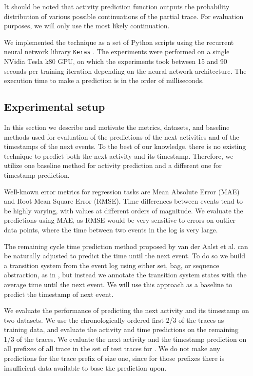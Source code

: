 \documentclass[runningheads,a4paper]{llncs}
\begin{document}
It should be noted that activity prediction function  outputs the probability distribution of various possible continuations of the partial trace. For evaluation purposes, we will only use the most likely continuation.

We implemented the technique as a set of Python scripts using the recurrent neural network library \texttt{Keras} \cite{Chollet2015}. The experiments were performed on a single NVidia Tesla k80 GPU, on which the experiments took between 15 and 90 seconds per training iteration depending on the neural network architecture. The execution time to make a prediction is in the order of milliseconds. 

\subsection{Experimental setup}
In this section we describe and motivate the metrics, datasets, and baseline methods used for evaluation of the predictions of the next activities and of the timestamps of the next events. To the best of our knowledge, there is no existing technique to predict both the next activity and its timestamp. Therefore, we utilize one baseline method for activity prediction and a different one for timestamp prediction.

Well-known error metrics for regression tasks are Mean Absolute Error (MAE) and Root Mean Square Error (RMSE). Time differences between events tend to be highly varying, with values at different orders of magnitude. We evaluate the predictions using MAE, as RMSE would be very sensitive to errors on outlier data points, where the time between two events in the log is very large. 

The remaining cycle time prediction method proposed by van der Aalst et al. \cite{Aalst2011} can be naturally adjusted to predict the time until the next event. To do so we build a transition system from the event log using either set, bag, or sequence abstraction, as in \cite{Aalst2011}, but instead we annotate the transition system states with the average time until the next event. We will use this approach as a baseline to predict the timestamp of next event.

We evaluate the performance of predicting the next activity and its timestamp on two datasets. We use the chronologically ordered first 2/3 of the traces as training data, and evaluate the activity and time predictions on the remaining 1/3 of the traces. We evaluate the next activity and the timestamp prediction on all prefixes  of all trace  in the set of test traces for . We do not make any predictions for the trace prefix of size one, since for those prefixes there is insufficient data available to base the prediction upon.
\end{document}
